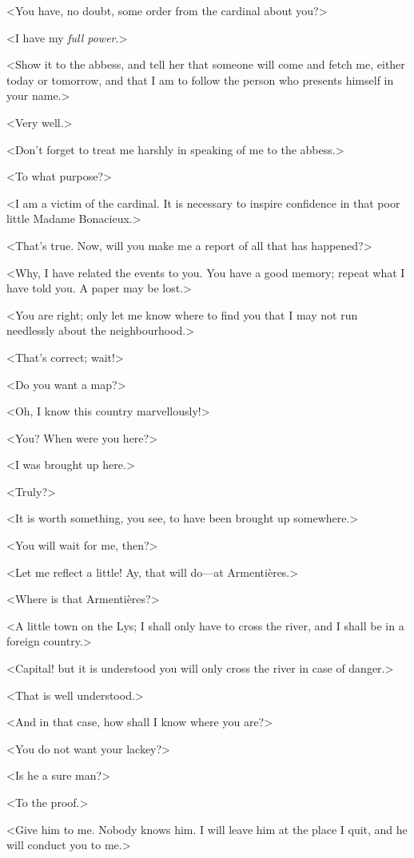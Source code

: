 <You have, no doubt, some order from the cardinal about you?> 

<I have my \textit{full power}.> 

<Show it to the abbess, and tell her that someone will come and fetch me, either today or tomorrow, and that I am to follow the person who presents himself in your name.> 

<Very well.> 

<Don't forget to treat me harshly in speaking of me to the abbess.> 

<To what purpose?> 

<I am a victim of the cardinal. It is necessary to inspire confidence in that poor little Madame Bonacieux.> 

<That's true. Now, will you make me a report of all that has happened?> 

<Why, I have related the events to you. You have a good memory; repeat what I have told you. A paper may be lost.> 

<You are right; only let me know where to find you that I may not run needlessly about the neighbourhood.> 

<That's correct; wait!> 

<Do you want a map?> 

<Oh, I know this country marvellously!> 

<You? When were you here?> 

<I was brought up here.> 

<Truly?> 

<It is worth something, you see, to have been brought up somewhere.> 

<You will wait for me, then?> 

<Let me reflect a little! Ay, that will do---at Armentières.> 

<Where is that Armentières?> 

<A little town on the Lys; I shall only have to cross the river, and I shall be in a foreign country.> 

<Capital! but it is understood you will only cross the river in case of danger.> 

<That is well understood.> 

<And in that case, how shall I know where you are?> 

<You do not want your lackey?> 

<Is he a sure man?> 

<To the proof.> 

<Give him to me. Nobody knows him. I will leave him at the place I quit, and he will conduct you to me.> 

